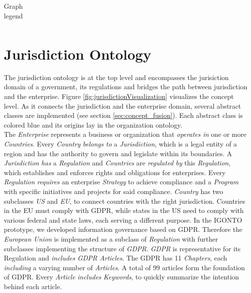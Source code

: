 \documentclass[
  a4paper,  %
  twoside,  %
  bibliography=totoc,
  headsepline,
  cleardoublepage=empty,
  parskip=half,
  draft=false
]{scrbook}
\begin{document}
\begin{table}
\begin{tabular}{ 
  |>{\centering\arraybackslash}m{}
  |>{\raggedright\arraybackslash}m{}| 
}
\end{tabular}
\caption{Graph legend}
\label{tab:legend}
\end{table}
 


\section{Jurisdiction Ontology}\label{sec:jurisdictionOntology}
The jurisdiction ontology is at the top level and encompasses the jurisiction domain of a government, its regulations and bridges the path between jurisdiction and the enterprise. Figure \ref{fig:jurisdictionVisualization} visualizes the concept level. As it connects the jurisdiction and the enterprise domain, several abstract classes are implemented (see section \ref{sec:concept_fusion}). Each abstract class is colored blue and its origins lay in the organization ontology.\\

The \textit{Enterprise} represents a business or organization that \textit{operates in} one or more \textit{Countries}. Every \textit{Country} \textit{belongs to} a \textit{Jurisdiction}, which is a legal entity of a region and has the authority to govern and legislate within its boundaries. A \textit{Jurisdiction} \textit{has} a \textit{Regulation} and \textit{Countries} are \textit{regulated by} this \textit{Regulation}, which establishes and enforces rights and obligations for enterprises. Every \textit{Regulation} \textit{requires} an enterprise \textit{Strategy} to achieve compliance and a \textit{Program} with specific initiatives and projects for said compliance. \textit{Country} has two subclasses \textit{US} and \textit{EU}, to connect countries with the right jurisdiction. Countries in the EU must comply with \acrshort{GDPR}, while states in the US need to comply with various federal and state laws, each serving a different purpose. In the IGONTO prototype, we developed information governance based on \acrshort{GDPR}. Therefore the \textit{European Union} is implemented as a subclass of \textit{Regulation} with further subclasses implementing the structure of \textit{GDPR}. \textit{GDPR} is representative for its Regulation and \textit{includes} \textit{GDPR Articles}. The GDPR has 11 \textit{Chapters}, each \textit{including} a varying number of \textit{Articles}. A total of 99 articles form the foundation of GDPR. Every \textit{Article} \textit{includes} \textit{Keywords}, to quickly summarize the intention behind each article. \\
\end{document}
